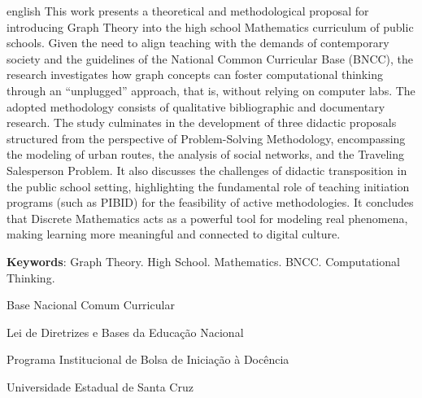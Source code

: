 \documentclass[
  12pt,
  oneside,
  a4paper,
  english,
  brazilian
  ]{abntex2}
\theoremstyle{definition}
\def\\{ }%
\def\vspace#1{ }%
\begin{document}
\begin{resumo}[Abstract]
 \begin{otherlanguage*}{english}
   This work presents a theoretical and methodological proposal for introducing Graph Theory into the high school Mathematics curriculum of public schools. Given the need to align teaching with the demands of contemporary society and the guidelines of the National Common Curricular Base (BNCC), the research investigates how graph concepts can foster computational thinking through an ``unplugged'' approach, that is, without relying on computer labs. The adopted methodology consists of qualitative bibliographic and documentary research. The study culminates in the development of three didactic proposals structured from the perspective of Problem-Solving Methodology, encompassing the modeling of urban routes, the analysis of social networks, and the Traveling Salesperson Problem. It also discusses the challenges of didactic transposition in the public school setting, highlighting the fundamental role of teaching initiation programs (such as PIBID) for the feasibility of active methodologies. It concludes that Discrete Mathematics acts as a powerful tool for modeling real phenomena, making learning more meaningful and connected to digital culture.
 \vspace{\onelineskip}
   \noindent \\
   \textbf{Keywords}: Graph Theory. High School. Mathematics. BNCC. Computational Thinking.
 \end{otherlanguage*}
\end{resumo}

\listoffigures*
\cleardoublepage

\begin{siglas}
  \item[BNCC] Base Nacional Comum Curricular
  \item[LDB]  Lei de Diretrizes e Bases da Educação Nacional
  \item[PIBID] Programa Institucional de Bolsa de Iniciação à Docência
  \item[UESC] Universidade Estadual de Santa Cruz
\end{siglas}
\end{document}
